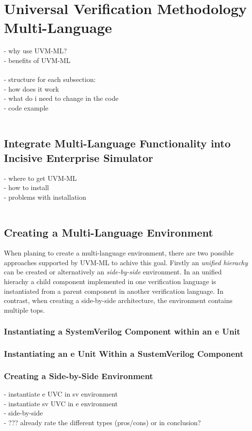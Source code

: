 \section{Universal Verification Methodology Multi-Language}\label{uvm_ml}
- why use UVM-ML?\\
- benefits of UVM-ML\\
\\
- structure for each subsection:\\
- how does it work\\
- what do i need to change in the code\\
- code example\\
\\
\subsection{Integrate Multi-Language Functionality into Incisive Enterprise
Simulator}
- where to get UVM-ML\\
- how to install\\
- problems with installation\\
\\
\subsection{Creating a Multi-Language Environment}
When planing to create a multi-language environment, there are two possible
approaches supported by UVM-ML to achive this goal. Firstly an \emph{unified
hierachy} can be created or alternatively an \emph{side-by-side} environment. In an unified
hierachy a child component implemented in one verification language is
instantiated from a parent component in another verification language. In
contrast, when creating a side-by-side architecture, the environment contains
multiple tops.

\subsubsection{Instantiating a SystemVerilog Component within an e Unit}

\subsubsection{Instantiating an e Unit Within a SustemVerilog Component}

\subsubsection{Creating a Side-by-Side Environment}
- instantiate e UVC in sv environment\\
- instantiate sv UVC in e environment\\
- side-by-side \\
- ??? already rate the different types (pros/cons) or in conclusion?\\
\\
